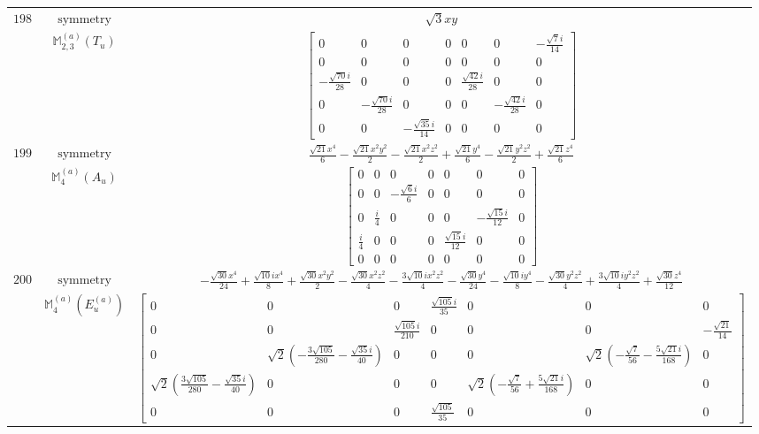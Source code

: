 \documentclass[fleqn,8pt,landscape]{jsarticle}
\begin{document}
\begin{longtable}{ccc}
$ 198 $ & $ \text{symmetry} $ & $ \sqrt{3} x y $ \\
$  $ & $ \mathbb{M}_{2,3}^{(a)}(T_{u}) $ & $ \begin{bmatrix} 0 & 0 & 0 & 0 & 0 & 0 & - \frac{\sqrt{7} i}{14} \\ 0 & 0 & 0 & 0 & 0 & 0 & 0 \\ - \frac{\sqrt{70} i}{28} & 0 & 0 & 0 & \frac{\sqrt{42} i}{28} & 0 & 0 \\ 0 & - \frac{\sqrt{70} i}{28} & 0 & 0 & 0 & - \frac{\sqrt{42} i}{28} & 0 \\ 0 & 0 & - \frac{\sqrt{35} i}{14} & 0 & 0 & 0 & 0 \end{bmatrix} $ \\ \hline
$ 199 $ & $ \text{symmetry} $ & $ \frac{\sqrt{21} x^{4}}{6} - \frac{\sqrt{21} x^{2} y^{2}}{2} - \frac{\sqrt{21} x^{2} z^{2}}{2} + \frac{\sqrt{21} y^{4}}{6} - \frac{\sqrt{21} y^{2} z^{2}}{2} + \frac{\sqrt{21} z^{4}}{6} $ \\
$  $ & $ \mathbb{M}_{4}^{(a)}(A_{u}) $ & $ \begin{bmatrix} 0 & 0 & 0 & 0 & 0 & 0 & 0 \\ 0 & 0 & - \frac{\sqrt{6} i}{6} & 0 & 0 & 0 & 0 \\ 0 & \frac{i}{4} & 0 & 0 & 0 & - \frac{\sqrt{15} i}{12} & 0 \\ \frac{i}{4} & 0 & 0 & 0 & \frac{\sqrt{15} i}{12} & 0 & 0 \\ 0 & 0 & 0 & 0 & 0 & 0 & 0 \end{bmatrix} $ \\ \hline
$ 200 $ & $ \text{symmetry} $ & $ - \frac{\sqrt{30} x^{4}}{24} + \frac{\sqrt{10} i x^{4}}{8} + \frac{\sqrt{30} x^{2} y^{2}}{2} - \frac{\sqrt{30} x^{2} z^{2}}{4} - \frac{3 \sqrt{10} i x^{2} z^{2}}{4} - \frac{\sqrt{30} y^{4}}{24} - \frac{\sqrt{10} i y^{4}}{8} - \frac{\sqrt{30} y^{2} z^{2}}{4} + \frac{3 \sqrt{10} i y^{2} z^{2}}{4} + \frac{\sqrt{30} z^{4}}{12} $ \\
$  $ & $ \mathbb{M}_{4}^{(a)}(E_{u}^{(a)}) $ & $ \begin{bmatrix} 0 & 0 & 0 & \frac{\sqrt{105} i}{35} & 0 & 0 & 0 \\ 0 & 0 & \frac{\sqrt{105} i}{210} & 0 & 0 & 0 & - \frac{\sqrt{21}}{14} \\ 0 & \sqrt{2} \left(- \frac{3 \sqrt{105}}{280} - \frac{\sqrt{35} i}{40}\right) & 0 & 0 & 0 & \sqrt{2} \left(- \frac{\sqrt{7}}{56} - \frac{5 \sqrt{21} i}{168}\right) & 0 \\ \sqrt{2} \left(\frac{3 \sqrt{105}}{280} - \frac{\sqrt{35} i}{40}\right) & 0 & 0 & 0 & \sqrt{2} \left(- \frac{\sqrt{7}}{56} + \frac{5 \sqrt{21} i}{168}\right) & 0 & 0 \\ 0 & 0 & 0 & \frac{\sqrt{105}}{35} & 0 & 0 & 0 \end{bmatrix} $ \\ \hline

\end{longtable}
\end{document}
